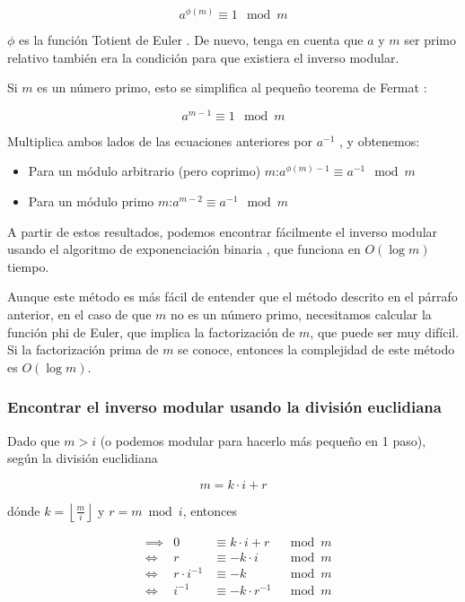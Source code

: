 $$a^{\phi (m)} \equiv 1 \mod m$$

$\phi$ es la función Totient de Euler . De nuevo, tenga en cuenta que $a$ y $m$ ser primo relativo también era la condición para que existiera el inverso modular.

Si $m$ es un número primo, esto se simplifica al pequeño teorema de Fermat :

$$a^{m - 1} \equiv 1 \mod m$$

Multiplica ambos lados de las ecuaciones anteriores por $a^{-1}$ , y obtenemos:

\begin{itemize}
	\item Para un módulo arbitrario (pero coprimo) $m$:$a^{\phi(m)-1}\equiv a ^{-1}\mod m$
	\item Para un módulo primo $m$:$a^{m-2} \equiv a^{-1}\mod m$
\end{itemize}

A partir de estos resultados, podemos encontrar fácilmente el inverso modular usando el algoritmo de exponenciación binaria , que funciona en $O(\log m)$ tiempo.

Aunque este método es más fácil de entender que el método descrito en el párrafo anterior, en el caso de que $m$ no es un número primo, necesitamos calcular la función phi de Euler, que implica la factorización de $m$, que puede ser muy difícil. Si la factorización prima de $m$ se conoce, entonces la complejidad de este método es $O(\log m)$.

\subsubsection{Encontrar el inverso modular usando la división euclidiana}

Dado que $m>i$ (o podemos modular para hacerlo más pequeño en 1 paso), según la división euclidiana

$$m = k \cdot i + r$$

dónde $k= \left\lfloor \frac{m}{i} \right\rfloor$ y $r=m \bmod i$, entonces


\begin{align*}
	& \implies & 0          & \equiv k \cdot i + r   & \mod m \\
	& \iff & r              & \equiv -k \cdot i      & \mod m \\
	& \iff & r \cdot i^{-1} & \equiv -k              & \mod m \\
	& \iff & i^{-1}         & \equiv -k \cdot r^{-1} & \mod m
\end{align*}



